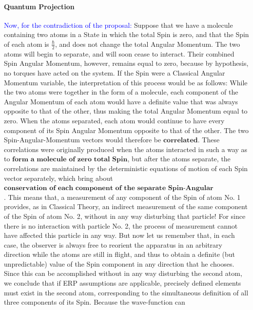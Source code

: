 \documentclass[a4paper, 10pt, onepage]{elegantbook}
\begin{document}
{\paragraph{Quantum Projection}
\noindent

\textcolor{blue}{Now, for the contradiction of the proposal:}  
Suppose that we have a molecule containing two atoms in a State in which the total Spin is zero, and that the Spin of 
each atom is $\frac{\hbar}{2}$, and does not change the total Angular Momentum. The two atoms will begin to separate, 
and will soon cease to interact. Their combined Spin Angular Momentum, however, remains equal to zero, because by 
hypothesis, no torques have acted on the system. If the Spin were a Classical Angular Momentum variable, the 
interpretation of this process would be as follows: While the two atoms were together in the form of a molecule, each 
component of the Angular Momentum of each atom would have a definite value that was always opposite to that of the 
other, thus making the total Angular Momentum equal to zero. When the atoms separated, each atom would continue to have 
every component of its Spin Angular Momentum opposite to that of the other. The two Spin-Angular-Momentum vectors would 
therefore be $\mathbf{correlated}$. These correlations were originally produced when the atoms interacted in such a way 
as to $\mathbf{\textbf{form a molecule of zero total Spin}}$, but after the atoms separate, the correlations are 
maintained by the deterministic equations of motion of each Spin vector separately, which bring about 
$\mathbf{\textbf{conservation of each component of the separate Spin-Angular Momentum vectors}}$.
This means that, a measurement of any component of the Spin of atom No. 1 provides, as in Classical Theory, an indirect 
measurement of the same component of the Spin of atom No. 2, without in any way disturbing that particle! For since 
there is no interaction with particle No. 2, the process of measurement cannot have affected this particle in any way.
But now let us remember that, in each case, the observer is always free to reorient the apparatus in an arbitrary 
direction while the atoms are still in flight, and thus to obtain a definite (but unpredictable) value of the Spin 
component in any direction that he chooses. Since this can be accomplished without in any way disturbing the second 
atom, we conclude that if ERP assumptions are applicable, precisely defined elements must exist in the second atom, 
corresponding to the simultaneous definition of all three components of its Spin. Because the wave-function can 
}
\end{document}
